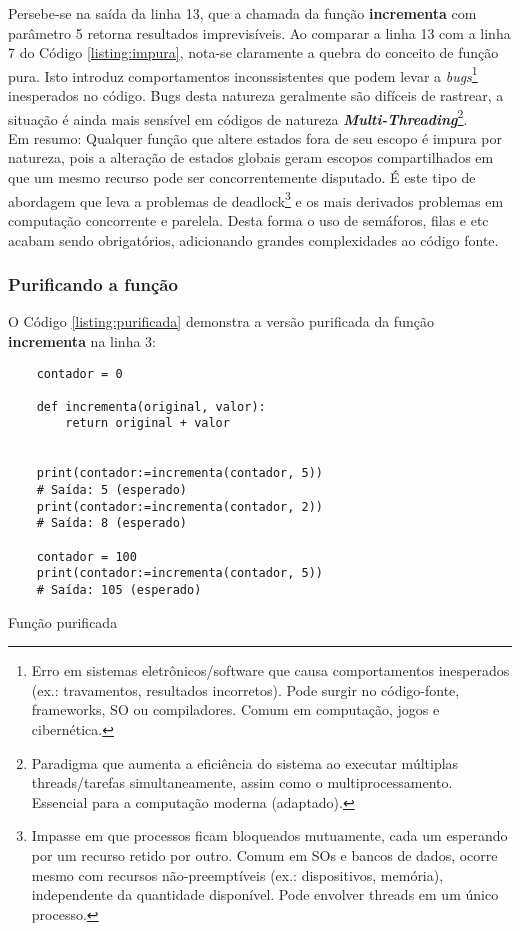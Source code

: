 Persebe-se na saída da linha 13, que a chamada da função \textbf{incrementa} com parâmetro 5 retorna resultados imprevisíveis. Ao comparar
a linha 13 com a linha 7 do Código \ref{listing:impura}, nota-se claramente a quebra do conceito de função pura. Isto introduz comportamentos inconssistentes
que podem levar a \textit{bugs}\footnote{
    Erro em sistemas eletrônicos/software que causa comportamentos inesperados (ex.: travamentos, resultados incorretos). Pode surgir no código-fonte, frameworks, SO ou compiladores. Comum em computação, jogos e cibernética\cite{wiki_bug}.
} inesperados no código. Bugs desta natureza geralmente são difíceis de rastrear, a situação é ainda
mais sensível em códigos de natureza \textit{\textbf{Multi-Threading}}\footnote{
    Paradigma que aumenta a eficiência do sistema ao executar múltiplas threads/tarefas simultaneamente, assim como o multiprocessamento. Essencial para a computação moderna\cite{wiki_multithreading} (adaptado).
}.\\
Em resumo: Qualquer função que altere estados fora de seu escopo é impura por natureza, pois a alteração de estados globais geram escopos compartilhados em que um mesmo recurso pode ser concorrentemente disputado.
É este tipo de abordagem que leva a problemas de deadlock\footnote{
    Impasse em que processos ficam bloqueados mutuamente, cada um esperando por um recurso retido por outro. Comum em SOs e bancos de dados, ocorre mesmo com recursos não-preemptíveis (ex.: dispositivos, memória), independente da quantidade disponível. Pode envolver threads em um único processo\cite{wiki_deadlock}.
} e os mais derivados problemas em computação concorrente e parelela. Desta forma o uso de semáforos, filas e etc acabam sendo obrigatórios, adicionando grandes complexidades ao código fonte.

\subsubsection{Purificando a função}
O Código \ref{listing:purificada} demonstra a versão purificada da função \textbf{incrementa} na linha 3:
\begin{listing}[!ht]
\begin{verbatim}
    contador = 0

    def incrementa(original, valor):
        return original + valor


    print(contador:=incrementa(contador, 5))
    # Saída: 5 (esperado)
    print(contador:=incrementa(contador, 2))
    # Saída: 8 (esperado)

    contador = 100
    print(contador:=incrementa(contador, 5))
    # Saída: 105 (esperado)
\end{verbatim}
\caption{Função purificada}
\label{listing:purificada}
\end{listing}\linebreak

